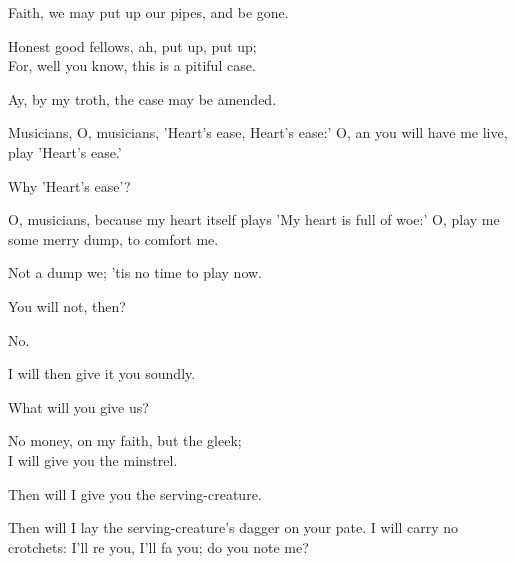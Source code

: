 \begin{speech}
Faith, we may put up our pipes,
and be gone. \\
\end{speech}
\begin{speech}
Honest good fellows, ah, put up, put up; \\
For, well you know, this is a pitiful case.  \\

\end{speech}
\begin{speech}
Ay, by my troth, the case may
be amended. 
\end{speech}
\begin{speech}
Musicians,  O, musicians, 'Heart's
ease, Heart's ease:' O, an you will have me
live, play 'Heart's ease.'
\end{speech}
\begin{speech}
Why 'Heart's ease'?
\end{speech}
\begin{speech}
O, musicians, because my heart itself
plays 'My heart is full of woe:' O, play me
some merry dump, to comfort me.
\end{speech}
\begin{speech}
Not a dump we; 'tis no time to
play now.
\end{speech}
\begin{speech}
You will not, then?
\end{speech}
\begin{speech}
No.
\end{speech}
\begin{speech}
I will then give it you soundly.
\end{speech}
\begin{speech}
What will you give us?
\end{speech}
\begin{speech}
No money, on my faith, but the gleek; \\
I will give you the minstrel. \\
\end{speech}
\begin{speech}
Then will I give you the
serving-creature.
\end{speech}
\begin{speech}
Then will I lay the serving-creature's
 dagger on your pate.   I will carry no
 crotchets: I'll re you, I'll fa you; do you
 note me?
\end{speech}
